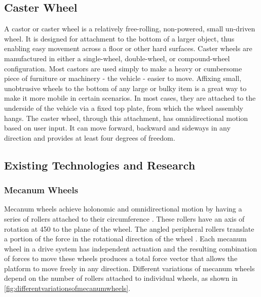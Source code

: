 \subsection{Caster Wheel}
A castor or caster wheel is a relatively free-rolling, non-powered, small un-driven wheel.
It is designed for attachment to the bottom of a larger object, thus enabling easy movement across a floor or other hard surfaces. Caster wheels are manufactured in either a
single-wheel, double-wheel, or compound-wheel configuration.
Most castors are used simply to make a heavy or cumbersome piece of furniture or machinery - the vehicle - easier to move. Affixing small, unobtrusive wheels to the bottom
of any large or bulky item is a great way to make it more mobile in certain scenarios. In
most cases, they are attached to the underside of the vehicle via a fixed top plate, from
which the wheel assembly hangs. The caster wheel, through this attachment, has omnidirectional motion based on user input. It can move forward, backward and sideways in any direction and provides at least four degrees of freedom. 

\subsection{Existing Technologies and Research}
\subsubsection{Mecanum Wheels}
 Mecanum wheels achieve holonomic and omnidirectional motion by having a series of rollers attached to their circumference \cite{diegel_improved_nodate}. These rollers have an axis of rotation at 450
to the plane of the wheel. The angled peripheral rollers translate
a portion of the force in the rotational direction of the wheel \cite{diegel_improved_nodate}. Each mecanum wheel in a drive system has independent actuation and the resulting combination of forces to move these wheels produces a total force vector that allows the platform to move freely
in any direction. Different variations of mecanum wheels depend on the number of rollers attached to individual wheels, as shown in 
\ref{fig:differentvariationsofmecanumwheels}.

